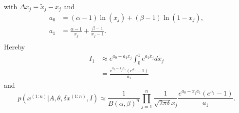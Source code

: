 \begin{example}
\begin{equation}
\begin{split}
		\end{split}
	\end{equation}
	with $\Delta x_j \equiv \tilde{x}_j-x_j$ and
	\begin{equation}
		\begin{split}
			a_0 & = (\alpha-1)\ln(x_j)+(\beta-1)\ln(1-x_j),\\
			a_1 & = \frac{\alpha-1}{x_j}+\frac{\beta-1}{x_j-1}.\\
		\end{split}
	\end{equation}
	Hereby
	\begin{equation}
		\begin{split}
			I_1 &\approx e^{a_0-a_1x_j}\int_0^1e^{a_1\tilde{x}_j}d\tilde{x}_j\\
			&= \frac{e^{a_0-x_j a_1}(e^{a_1}-1)}{a_1}
		\end{split}
	\end{equation}
	and
	\begin{equation}
		p(x^{(1:n)}|A,\theta,\delta x^{(1:n)}, I) \approx\frac{1}{B(\alpha,\beta)^n}\prod_{j=1}^{n}\frac{1}{\sqrt{2\pi \delta} x_j}\frac{e^{a_0-x_j a_1}(e^{a_1}-1)}{a_1}.
		\label{likelihood3}
	\end{equation}
\end{example}

